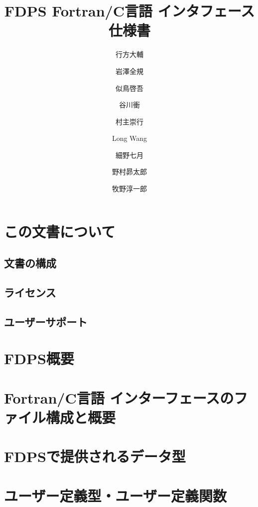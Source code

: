 \documentclass[12pt,a4paper,dvipdfmx]{jbook} %
\title{FDPS Fortran/C言語 インタフェース 仕様書}
\author{行方大輔}
\author{岩澤全規}
\author{似鳥啓吾}
\author{谷川衝}
\author{村主崇行}
\author{Long Wang}
\author{細野七月}
\author{野村昴太郎}
\author{牧野淳一郎}
\affil{理化学研究所 計算科学研究センター 粒子系シミュレータ研究チーム}
\date{}
\begin{document}
\maketitle
\tableofcontents

\newpage

\chapter{この文書について}
\label{chap:about}
\section{文書の構成}
\label{sec:structure}

\newpage
\section{ライセンス}
\label{sec:license}

\newpage
\section{ユーザーサポート}
\label{sec:user_support}

\newpage


\chapter{FDPS概要}
\label{chap:overview}

\newpage

\chapter{Fortran/C言語 インターフェースのファイル構成と概要}
\label{chap:file_str_and_ftn_if_overview}

\newpage

\chapter{FDPSで提供されるデータ型}
\label{chap:data_types}

\newpage

\chapter{ユーザー定義型・ユーザー定義関数}
\label{chap:user_defined}

\newpage
\end{document}
